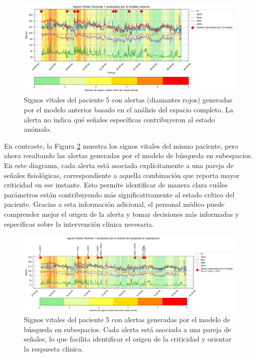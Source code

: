 \begin{figure}[ht]
  \centering
  \includegraphics[width=\textwidth]{Images/alertas_modelo_anterior_paciente5.png}
  \caption{Signos vitales del paciente 5 con alertas (diamantes rojos) generadas por el modelo anterior basado en el análisis del espacio completo. La alerta no indica qué señales específicas contribuyeron al estado anómalo.}
  \label{fig:alertas_modelo_anterior_paciente5}
\end{figure}

En contraste, la Figura \ref{fig:alertas_subespacios_paciente5} muestra los signos vitales del mismo paciente, pero ahora resaltando las alertas generadas por el modelo de búsqueda en subespacios. En este diagrama, cada alerta está asociada explícitamente a una pareja de señales fisiológicas, correspondiente a aquella combinación que reporta mayor criticidad en ese instante. Esto permite identificar de manera clara cuáles parámetros están contribuyendo más significativamente al estado crítico del paciente. Gracias a esta información adicional, el personal médico puede comprender mejor el origen de la alerta y tomar decisiones más informadas y específicas sobre la intervención clínica necesaria.

\begin{figure}[ht]
  \centering
  \includegraphics[width=\textwidth]{Images/alertas_subespacios_paciente5.png}
  \caption{Signos vitales del paciente 5 con alertas generadas por el modelo de búsqueda en subespacios. Cada alerta está asociada a una pareja de señales, lo que facilita identificar el origen de la criticidad y orientar la respuesta clínica.}
  \label{fig:alertas_subespacios_paciente5}
\end{figure}

